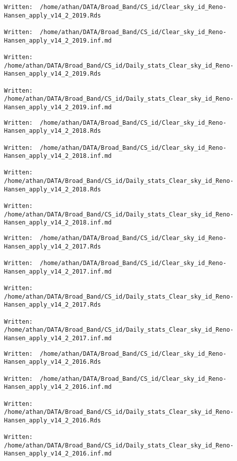 \documentclass[
  10pt,
  a4paper,oneside]{article}
\begin{document}
\begin{verbatim}
Written:  /home/athan/DATA/Broad_Band/CS_id/Clear_sky_id_Reno-Hansen_apply_v14_2_2019.Rds 

Written:  /home/athan/DATA/Broad_Band/CS_id/Clear_sky_id_Reno-Hansen_apply_v14_2_2019.inf.md 

Written:  /home/athan/DATA/Broad_Band/CS_id/Daily_stats_Clear_sky_id_Reno-Hansen_apply_v14_2_2019.Rds 

Written:  /home/athan/DATA/Broad_Band/CS_id/Daily_stats_Clear_sky_id_Reno-Hansen_apply_v14_2_2019.inf.md 
\end{verbatim}

\begin{verbatim}
Written:  /home/athan/DATA/Broad_Band/CS_id/Clear_sky_id_Reno-Hansen_apply_v14_2_2018.Rds 

Written:  /home/athan/DATA/Broad_Band/CS_id/Clear_sky_id_Reno-Hansen_apply_v14_2_2018.inf.md 

Written:  /home/athan/DATA/Broad_Band/CS_id/Daily_stats_Clear_sky_id_Reno-Hansen_apply_v14_2_2018.Rds 

Written:  /home/athan/DATA/Broad_Band/CS_id/Daily_stats_Clear_sky_id_Reno-Hansen_apply_v14_2_2018.inf.md 
\end{verbatim}

\begin{verbatim}
Written:  /home/athan/DATA/Broad_Band/CS_id/Clear_sky_id_Reno-Hansen_apply_v14_2_2017.Rds 

Written:  /home/athan/DATA/Broad_Band/CS_id/Clear_sky_id_Reno-Hansen_apply_v14_2_2017.inf.md 

Written:  /home/athan/DATA/Broad_Band/CS_id/Daily_stats_Clear_sky_id_Reno-Hansen_apply_v14_2_2017.Rds 

Written:  /home/athan/DATA/Broad_Band/CS_id/Daily_stats_Clear_sky_id_Reno-Hansen_apply_v14_2_2017.inf.md 
\end{verbatim}

\begin{verbatim}
Written:  /home/athan/DATA/Broad_Band/CS_id/Clear_sky_id_Reno-Hansen_apply_v14_2_2016.Rds 

Written:  /home/athan/DATA/Broad_Band/CS_id/Clear_sky_id_Reno-Hansen_apply_v14_2_2016.inf.md 

Written:  /home/athan/DATA/Broad_Band/CS_id/Daily_stats_Clear_sky_id_Reno-Hansen_apply_v14_2_2016.Rds 

Written:  /home/athan/DATA/Broad_Band/CS_id/Daily_stats_Clear_sky_id_Reno-Hansen_apply_v14_2_2016.inf.md 
\end{verbatim}
\end{document}
